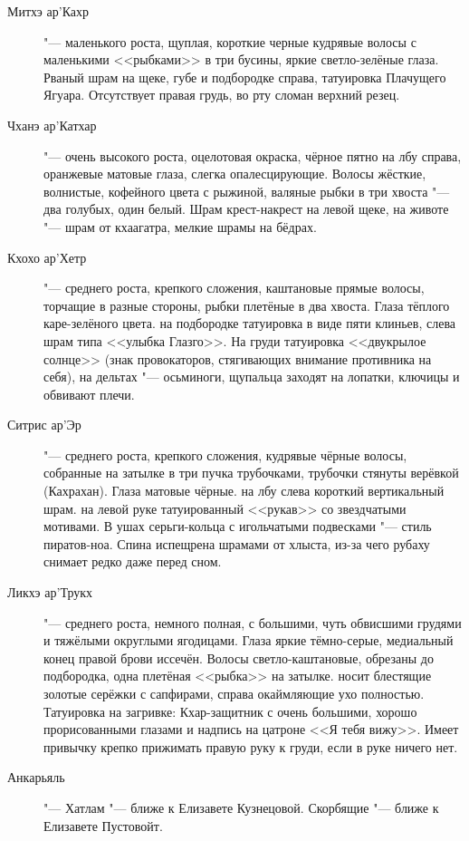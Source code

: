 \documentclass[a4paper,10pt]{book}
\begin{document}
\begin{description}
\item[Митхэ ар'Кахр] "--- маленького роста, щуплая, короткие черные кудрявые 
волосы с маленькими 
<<рыбками>> в три бусины, яркие светло-зелёные глаза. Рваный шрам на щеке, губе 
и подбородке справа, татуировка Плачущего Ягуара. Отсутствует правая грудь, во 
рту сломан верхний резец.
\item[Чханэ ар'Катхар] "--- очень высокого роста, оцелотовая окраска, чёрное 
пятно на лбу справа, оранжевые 
матовые глаза, слегка опалесцирующие. Волосы жёсткие, волнистые, кофейного 
цвета 
с рыжиной, валяные рыбки в три хвоста "--- два голубых, один белый. Шрам 
крест-накрест на левой щеке, на животе "--- шрам от кхаагатра, мелкие шрамы на 
бёдрах.
\item[Кхохо ар'Хетр] "--- среднего роста, крепкого сложения, каштановые прямые 
волосы, торчащие в разные 
стороны, рыбки плетёные в два хвоста. Глаза тёплого каре-зелёного цвета. на 
подбородке татуировка в виде пяти клиньев, слева шрам типа <<улыбка Глазго>>. 
На 
груди татуировка <<двукрылое солнце>> (знак провокаторов, стягивающих внимание 
противника на себя), на дельтах "--- осьминоги, щупальца 
заходят на лопатки, ключицы и обвивают плечи.
\item[Ситрис ар'Эр] "--- среднего роста, крепкого сложения, кудрявые чёрные 
волосы, собранные на затылке 
в три пучка трубочками, трубочки стянуты верёвкой (Кахрахан). Глаза матовые 
чёрные. на лбу слева  короткий вертикальный шрам. на левой руке татуированный 
<<рукав>> со звездчатыми мотивами. В ушах серьги-кольца с игольчатыми 
подвесками 
"--- стиль пиратов-ноа. Спина испещрена шрамами от хлыста, из-за чего рубаху 
снимает редко даже перед сном.
\item[Ликхэ ар'Трукх] "--- среднего роста, немного полная, с большими, чуть 
обвисшими грудями и тяжёлыми 
округлыми ягодицами. Глаза яркие тёмно-серые, медиальный конец правой брови 
иссечён. Волосы светло-каштановые, обрезаны до подбородка, одна плетёная 
<<рыбка>> на затылке. носит блестящие золотые серёжки с сапфирами, справа 
окаймляющие ухо полностью. Татуировка на загривке: Кхар-защитник с очень 
большими, хорошо прорисованными глазами и надпись на цатроне <<Я тебя вижу>>. 
Имеет привычку крепко прижимать правую руку к груди, если в руке ничего нет.
\item[Анкарьяль] "--- Хатлам "--- ближе к Елизавете Кузнецовой. Скорбящие "--- 
ближе к Елизавете Пустовойт.
\end{description}
\end{document}
